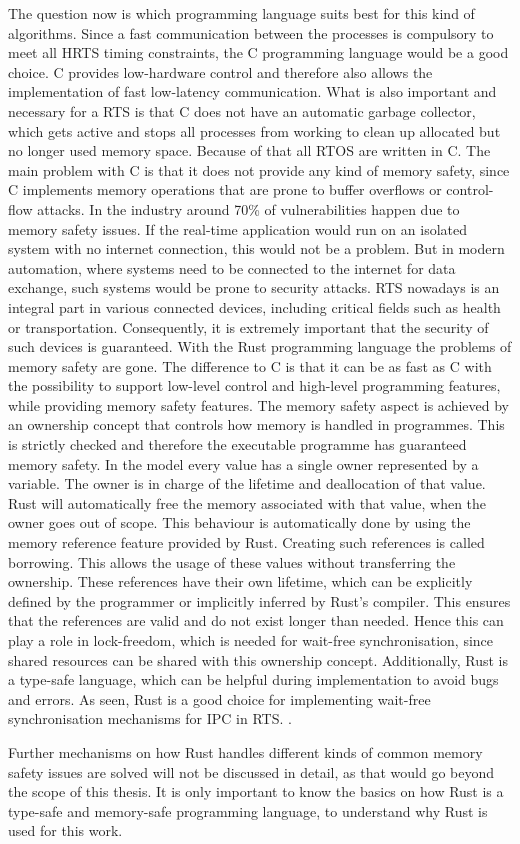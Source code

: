 The question now is which programming language suits best for this kind of algorithms. Since a fast communication between the processes is compulsory to meet all \ac{HRTS} timing constraints, the C programming language would be a good choice. C provides low-hardware control and therefore also allows the implementation of fast low-latency communication. What is also important and necessary for a \ac{RTS} is that C does not have an automatic garbage collector, which gets active and stops all processes from working to clean up allocated but no longer used memory space. Because of that all \ac{RTOS} are written in C. The main problem with C is that it does not provide any kind of memory safety, since C implements memory operations that are prone to buffer overflows or control-flow attacks. In the industry around 70\% of vulnerabilities happen due to memory safety issues. If the real-time application would run on an isolated system with no internet connection, this would not be a problem. But in modern automation, where systems need to be connected to the internet for data exchange, such systems would be prone to security attacks. \ac{RTS} nowadays is an integral part in various connected devices, including critical fields such as health or transportation. Consequently, it is extremely important that the security of such devices is guaranteed. With the Rust programming language the problems of memory safety are gone. The difference to C is that it can be as fast as C with the possibility to support low-level control and high-level programming features, while providing memory safety features. The memory safety aspect is achieved by an ownership concept that controls how memory is handled in programmes. This is strictly checked and therefore the executable programme has guaranteed memory safety. In the model every value has a single owner represented by a variable. The owner is in charge of the lifetime and deallocation of that value. Rust will automatically free the memory associated with that value, when the owner goes out of scope. This behaviour is automatically done by using the memory reference feature provided by Rust. Creating such references is called borrowing. This allows the usage of these values without transferring the ownership. These references have their own lifetime, which can be explicitly defined by the programmer or implicitly inferred by Rust's compiler. This ensures that the references are valid and do not exist longer than needed. Hence this can play a role in lock-freedom, which is needed for wait-free synchronisation, since shared resources can be shared with this ownership concept. Additionally, Rust is a type-safe language, which can be helpful during implementation to avoid bugs and errors. As seen, Rust is a good choice for implementing wait-free synchronisation mechanisms for \ac{IPC} in \ac{RTS}. \cite{xu2023rust, culic2022lowRust}. 

Further mechanisms on how Rust handles different kinds of common memory safety issues are solved will not be discussed in detail, as that would go beyond the scope of this thesis. It is only important to know the basics on how Rust is a type-safe and memory-safe programming language, to understand why Rust is used for this work.